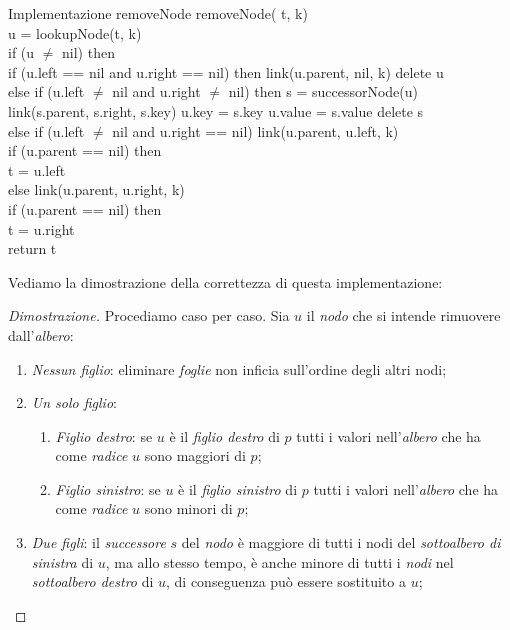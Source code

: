\begin{minicode}{Implementazione removeNode}
\ind{} removeNode( t,  k)\\
     u = lookupNode(t, k)\\
    \indf if (u $\neq$ nil) then\\
        \indff if (u.left == nil and u.right == nil) then\hfill{}
            link(u.parent, nil, k)\hfill{}
            delete u\\
        \indff else if (u.left $\neq$ nil and u.right $\neq$ nil) then\hfill{}
             s = successorNode(u)\\
            link(s.parent, s.right, s.key)\hfill{}
            u.key = s.key\hfill{}
            u.value = s.value\hfill{}
            delete s\\
        \indff else if (u.left $\neq$ nil and u.right == nil)\hfill{}
            link(u.parent, u.left, k)\\
            \indfff if (u.parent == nil) then\\
                t = u.left\\
        \indff else\hfill{}
            link(u.parent, u.right, k)\\
            \indfff if (u.parent == nil) then\\
                t = u.right\\
    \indf return t
\end{minicode}\noindent
Vediamo la dimostrazione della correttezza di questa implementazione:
\begin{proof}[Dimostrazione]
    Procediamo caso per caso. Sia $u$ il \emph{nodo} che si
    intende rimuovere dall'\emph{albero}:
    \begin{enumerate}
        \item \emph{Nessun figlio}: eliminare \emph{foglie} non inficia
        sull'ordine degli altri nodi;
        \item \emph{Un solo figlio}:
        \begin{enumerate}
            \item \emph{Figlio destro}: se $u$ è il \emph{figlio destro} di $p$
            tutti i valori nell'\emph{albero} che ha come \emph{radice} $u$ sono
            maggiori di $p$;
            \item \emph{Figlio sinistro}: se $u$ è il \emph{figlio sinistro} di $p$
            tutti i valori nell'\emph{albero} che ha come \emph{radice} $u$ sono
            minori di $p$;
        \end{enumerate}
        \item \emph{Due figli}: il \emph{successore} $s$ del \emph{nodo} è
        maggiore di tutti i nodi del \emph{sottoalbero di sinistra} di $u$,
        ma allo stesso tempo, è anche minore di tutti i \emph{nodi} nel
        \emph{sottoalbero destro} di $u$, di conseguenza può essere sostituito
        a $u$;
    \end{enumerate}
\end{proof}

